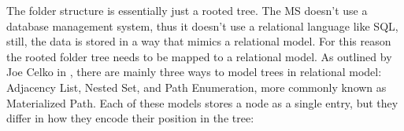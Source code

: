The folder structure is essentially just a rooted tree.
The MS doesn't use a database management system, thus it doesn't use a relational
language like SQL, still, the data is stored in a way that mimics a relational model.
For this reason the rooted folder tree needs to be mapped to a relational model.
%
As outlined by Joe Celko in \cite[28]{celkoSQLTrees}, there are mainly three ways to model
trees in relational model:
Adjacency List, Nested Set, and  Path Enumeration, more commonly known as Materialized Path.
Each of these models stores a node as a single entry, but they differ in how they encode
their position in the tree:


